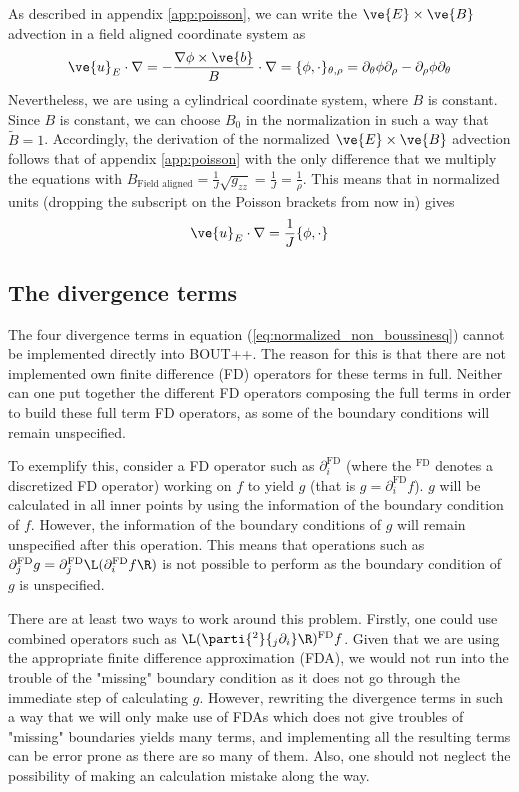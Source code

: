 As described in appendix \ref{app:poisson}, we can write the
$\ve{E}\times\ve{B}$ advection in a field aligned coordinate system as
%
\begin{align}
    \ve{u}_E\cdot\nabla
    = -\frac{\nabla\phi\times\ve{b}}{B}\cdot\nabla
    = \{\phi, \cdot\}_{\theta,\rho}
    = \partial_\theta\phi\partial_\rho - \partial_\rho\phi\partial_\theta
    \label{eq:non_norm_adv}
\end{align}
%
Nevertheless, we are using a cylindrical coordinate system, where $B$ is
constant.  Since $B$ is constant,
we can choose $B_0$ in the normalization in such a way that $\widetilde{B}=1$.
Accordingly, the derivation of the normalized $\ve{E}\times \ve{B}$ advection
follows that of appendix \ref{app:poisson} with the only difference that we
multiply the equations with
$B_\text{Field aligned}=\frac{1}{J}\sqrt{g_{zz}}=\frac{1}{J}=\frac{1}{\rho}$.
This means that in normalized units (dropping the subscript on the Poisson
brackets from now in) gives
%
\begin{align*}
    \ve{u}_E\cdot\nabla = \frac{1}{J}\{\phi, \cdot\}
\end{align*}


\subsection{The divergence terms}
%
The four divergence terms in equation (\ref{eq:normalized_non_boussinesq})
cannot be implemented directly into BOUT++. The reason for this is that there
are not implemented own finite difference (FD) operators for these terms in
full. Neither can one put together the different FD operators composing the
full terms in order to build these full term FD operators, as some of the
boundary conditions will remain unspecified.

To exemplify this, consider a FD operator such as $\partial^{\text{FD}}_i$
(where the $^\text{FD}$ denotes a discretized FD operator) working on $f$ to
yield $g$ (that is $g = \partial^{\text{FD}}_if$). $g$ will be calculated in
all inner points by using the information of the boundary condition of $f$.
However, the information of the boundary conditions of $g$ will remain
unspecified after this operation.  This means that operations such as
$\partial^{\text{FD}}_j g = \partial_j^{\text{FD}}\L(\partial_i^{\text{FD}}
f\R)$ is not possible to perform as the boundary condition of $g$ is
unspecified.

There are at least two ways to work around this problem. Firstly, one could use
combined operators such as $\L(\parti{^2}{_j\partial_i}\R)^\text{FD}f$.  Given
that we are using the appropriate finite difference approximation (FDA), we
would not run into the trouble of the "missing" boundary condition as it does
not go through the immediate step of calculating $g$.  However, rewriting the
divergence terms in such a way that we will only make use of FDAs which does
not give troubles of "missing" boundaries yields many terms, and implementing
all the resulting terms can be error prone as there are so many of them. Also,
one should not neglect the possibility of making an calculation mistake along
the way.

